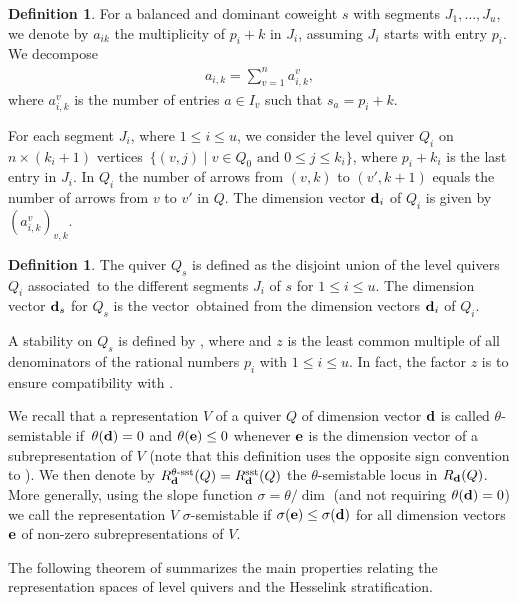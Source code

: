 \documentclass[10pt,a4paper]{amsart}
\numberwithin{equation}{section}
\theoremstyle{definition}
\newtheorem{Definition}[Theorem]{Definition}
\begin{document}
\begin{Definition}
For a balanced and dominant coweight $s$ with segments $J_1, \dots, J_u$, we denote by $a_{ik}$ the multiplicity of $p_i +k$ in $J_i$, assuming $J_i$ starts with entry $p_i$. We decompose
\begin{align*}
a_{i,k} = \sum_{v=1}^n a_{i,k}^v ,
\end{align*}
where $a_{i,k}^v$ is the number of entries $a \in I_v$ such that $s_a = p_i +k$.

For each segment $J_i$, where $1 \leq i \leq u$, we consider the level quiver $Q_i$ on $n \times (k_{i} +1)$ vertices~${
\{ (v,j) \mid v \in Q_0 \text{ and } 0\leq j \leq k_i \} }$,
where $p_i +k_i$ is the last entry in $J_i$. In $Q_i$ the number of arrows from $(v,k)$ to $(v',k+1)$ equals the number of arrows from $v$ to $v'$ in $Q$. The dimension vector ${\bf d}_i$ of $Q_i$ is given by $(a_{i,k}^v)_{v,k}$.
\end{Definition}

\begin{Definition}\label{levelquiver}
The quiver $Q_s$ is defined as the disjoint union of the level quivers $Q_i$ associated~to the different segments $J_i$ of $s$ for $1 \leq i \leq u$. The dimension vector ${\bf d}_{s}$ for $Q_{s}$ is the vector~obtained from the dimension vectors ${\bf d}_i$ of $Q_i$.

A stability on $Q_{s}$ is defined by , where  and $z$ is the least common multiple of all denominators of the rational numbers $p_i$ with $1 \leq i \leq u$. In fact, the factor $z$ is to ensure compatibility with \cite{LB}.
\end{Definition}

We recall that a representation $V$ of a quiver $Q$ of dimension vector ${\bf d}$ is called $\theta$-semistable if~${\theta({\bf d})=0}$ and $\theta({\bf e})\leq 0$ whenever ${\bf e}$ is the dimension vector of a subrepresentation of $V$ (note that this definition uses the opposite sign convention to \cite{LB}). We then denote by $R_{\bf d}^{\theta\text{\rm -sst}}(Q)=R_{\bf d}^{\mathrm{sst}}(Q)$ the $\theta$-semistable locus in $R_{\bf d}(Q)$. More generally, using the slope function $\sigma=\theta/{\dim}$ (and not requiring $\theta({\bf d})=0$) we call the representation $V$ $\sigma$-semistable if $\sigma({\bf e})\leq\sigma({\bf d})$ for all dimension vectors ${\bf e}$ of non-zero subrepresentations of $V$.

The following theorem of \cite{LB} summarizes the main properties relating the representation spaces of level quivers and the Hesselink stratification.
\end{document}
